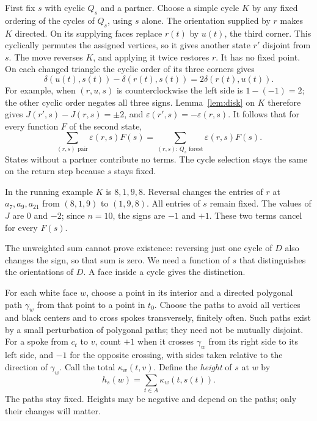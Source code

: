 \documentclass[10pt,a4paper]{amsart}
\theoremstyle{remark}
\newcommand{\eps}{\varepsilon}
\begin{document}
First fix $s$ with cyclic $Q_s$ and a partner. Choose a simple cycle $K$ by any fixed ordering of the cycles of $Q_s$, using $s$ alone. The orientation supplied by $r$ makes $K$ directed. On its supplying faces replace $r(t)$ by $u(t)$, the third corner. This cyclically permutes the assigned vertices, so it gives another state $r'$ disjoint from $s$. The move reverses $K$, and applying it twice restores $r$. It has no fixed point. On each changed triangle the cyclic order of its three corners gives
\[
 \delta(u(t),s(t))-\delta(r(t),s(t))=2\delta(r(t),u(t)).
\]
For example, when $(r,u,s)$ is counterclockwise the left side is $1-(-1)=2$; the other cyclic order negates all three signs. Lemma~\ref{lem:disk} on $K$ therefore gives $J(r',s)-J(r,s)=\pm2$, and $\eps(r',s)=-\eps(r,s)$. It follows that for every function $F$ of the second state,
\begin{equation}\label{eq:cancel}
 \sum_{(r,s)\text{ pair}}\eps(r,s)F(s)
 =\sum_{(r,s):\,Q_s\text{ forest}}\eps(r,s)F(s).
\end{equation}
States without a partner contribute no terms. The cycle selection stays the same on the return step because $s$ stays fixed.

In the running example $K$ is $8,1,9,8$. Reversal changes the entries of $r$ at $a_7,a_9,a_{21}$ from $(8,1,9)$ to $(1,9,8)$. All entries of $s$ remain fixed. The values of $J$ are $0$ and $-2$; since $n=10$, the signs are $-1$ and $+1$. These two terms cancel for every $F(s)$.

The unweighted sum cannot prove existence: reversing just one cycle of $D$ also changes the sign, so that sum is zero. We need a function of $s$ that distinguishes the orientations of $D$. A face inside a cycle gives the distinction.

For each white face $w$, choose a point in its interior and a directed polygonal path $\gamma_w$ from that point to a point in $t_0$. Choose the paths to avoid all vertices and black centers and to cross spokes transversely, finitely often. Such paths exist by a small perturbation of polygonal paths; they need not be mutually disjoint. For a spoke from $c_t$ to $v$, count $+1$ when it crosses $\gamma_w$ from its right side to its left side, and $-1$ for the opposite crossing, with sides taken relative to the direction of $\gamma_w$. Call the total $\kappa_w(t,v)$. Define the \emph{height} of $s$ at $w$ by
\begin{equation}\label{eq:height}
 h_s(w)=\sum_{t\in A}\kappa_w(t,s(t)).
\end{equation}
The paths stay fixed. Heights may be negative and depend on the paths; only their changes will matter.
\end{document}
